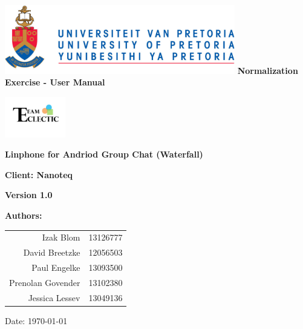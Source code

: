 \begin{titlepage}
\begin{flushright}

\includegraphics[width=380px]{images/University_of_Pretoria_Logo.png}
\newline
\newline
\textbf {\LARGE Normalization Exercise - User Manual} \newline


\centering\includegraphics[width=100px]{images/Logo.jpg}

\begin{flushleft}
\textbf {\Large Linphone for Andriod Group Chat (Waterfall)}\newline

\textbf {\Large Client: Nanoteq}\newline


\textbf {\large Version 1.0}\newline
\end{flushleft}
\centering \textbf {\large Authors:}

\begin{table}[H]
\large
\centering
\begin{tabular}{rl}
	Izak Blom & 13126777 \\
	David Breetzke & 12056503 \\
	Paul Engelke & 13093500 \\
	Prenolan Govender & 13102380 \\
	Jessica Lessev & 13049136 \\
\end{tabular}
\end{table}

Date: \today

\end{flushright}
\end{titlepage}